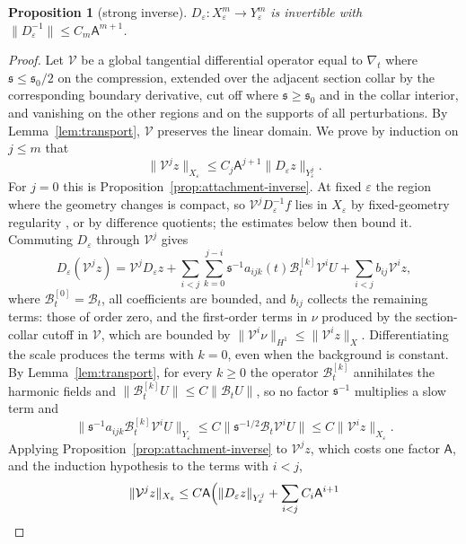 \documentclass[11pt]{amsart}
\newtheorem{proposition}[theorem]{Proposition}
\theoremstyle{definition}
\theoremstyle{remark}
\theoremstyle{plain}
\numberwithin{equation}{section}
\newcommand{\eps}{\varepsilon}
\begin{document}
\begin{proposition}[strong inverse]\label{prop:strong-inverse}
$D_\eps\colon X^m_\eps\to Y^m_\eps$ is invertible with
$\|D_\eps^{-1}\|\le C_m\mathsf A^{m+1}$.
\end{proposition}

\begin{proof}
Let $\mathcal V$ be a global tangential differential operator equal to $\nabla_t$ where
${\mathfrak s}\le{\mathfrak s}_0/2$ on the compression, extended over the adjacent section collar
by the corresponding boundary derivative, cut off where ${\mathfrak s}\ge{\mathfrak s}_0$ and in
the collar interior, and vanishing on the other regions and on the supports of
all perturbations. By Lemma~\ref{lem:transport}, $\mathcal V$ preserves the linear
domain. We prove by induction on $j\le m$ that
\begin{equation}\label{eq:time-derivatives}
\|\mathcal V^jz\|_{X_\eps}\le C_j\mathsf A^{j+1}\|D_\eps z\|_{Y^j_\eps}.
\end{equation}
For $j=0$ this is Proposition~\ref{prop:attachment-inverse}. At fixed $\eps$ the region
where the geometry changes is compact, so $\mathcal V^jD_\eps^{-1}f$ lies in $X_\eps$ by
fixed-geometry regularity \cite[Theorem~4.17 and Remark~4.19]{DFL}, or by difference
quotients; the estimates below then bound it. Commuting $D_\eps$ through
$\mathcal V^j$ gives
\[
D_\eps(\mathcal V^jz)=\mathcal V^jD_\eps z+
\sum_{i<j}\sum_{k=0}^{j-i}{\mathfrak s}^{-1}a_{ijk}(t)
\mathcal B^{[k]}_t\mathcal V^iU+\sum_{i<j}b_{ij}\mathcal V^iz,
\]
where $\mathcal B^{[0]}_t=\mathcal B_t$, all coefficients are bounded,
and $b_{ij}$ collects the remaining terms: those of order zero, and the
first-order terms in $\nu$ produced by the section-collar cutoff in $\mathcal V$,
which are bounded by $\|\mathcal V^i\nu\|_{H^1}\le\|\mathcal V^iz\|_X$. Differentiating the scale
produces the terms with $k=0$, even when the background is constant. By
Lemma~\ref{lem:transport}, for every $k\ge0$ the operator
$\mathcal B^{[k]}_t$ annihilates the harmonic fields and
$\|\mathcal B^{[k]}_tU\|\le C\|\mathcal B_tU\|$, so no factor ${\mathfrak s}^{-1}$ multiplies a slow
term and
\[
\|{\mathfrak s}^{-1}a_{ijk}\mathcal B^{[k]}_t\mathcal V^iU\|_{Y_\eps}\le C\|{\mathfrak s}^{-1/2}\mathcal B_t\mathcal V^iU\|\le
C\|\mathcal V^iz\|_{X_\eps}.
\]
Applying Proposition~\ref{prop:attachment-inverse} to $\mathcal V^jz$, which costs one factor
$\mathsf A$, and the induction hypothesis to the terms with $i<j$,
\[
\|\mathcal V^jz\|_{X_\eps}\le C\mathsf A\Bigl(\|D_\eps z\|_{Y^j_\eps}+\sum_{i<j}C_i\mathsf A^{i+1}
\]
\end{proof}
\end{document}
